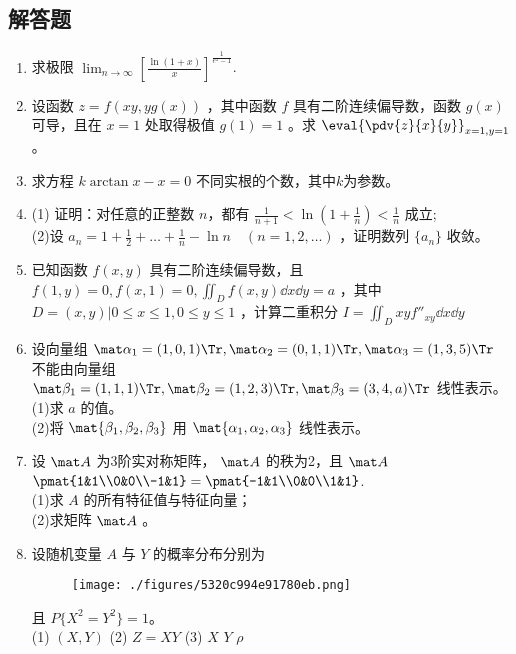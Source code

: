 \subsection{解答题}
\begin{enumerate}
\item 求极限  $\displaystyle \lim_{n\to\infty}[\frac{\ln (1+x)}{x}]^{\frac{1}{e^x-1}}$.
\item 设函数 $z=f(xy,yg(x))$ ，其中函数 $f$ 具有二阶连续偏导数，函数 $g(x)$ 可导，且在 $x=1$ 处取得极值 $g(1)=1$ 。求 $\displaystyle \eval{\pdv{z}{x}{y}}_{x=1,y=1}$。
\item 求方程 $k\arctan x -x=0$ 不同实根的个数，其中$ k$为参数。
\item (1) 证明：对任意的正整数 $n$，都有 $\frac{1}{n+1}<\ln(1+\frac{1}{n})<\frac{1}{n}$ 成立;\\
(2)设 $\displaystyle a_n=1+\frac{1}{2}+\dots+\frac{1}{n}-\ln n\quad (n=1,2,\dots )$  ，证明数列 $\{a_n\}$ 收敛。
\item 已知函数 $f(x,y)$ 具有二阶连续偏导数，且 $f(1,y)=0,f(x,1)=0,\iint_D f(x,y)\dd{x}\dd{y}=a$  ，其中 $D={(x,y)|0\le x \le 1,0 \le y \le 1}$ ，计算二重积分 $\displaystyle I=\iint_D xyf''_{xy}\dd{x}\dd{y}$
\item 设向量组  $\mat \alpha_1=(1,0,1) \Tr,\mat \alpha_2=(0,1,1)\Tr,\mat \alpha_3=(1,3,5)\Tr$  不能由向量组 $ \mat \beta_1=(1,1,1) \Tr,\mat \beta_2=(1,2,3) \Tr,\mat \beta_3=(3,4,a) \Tr$ 线性表示。\\
(1)求 $a$ 的值。\\
(2)将 $\mat {\beta_1,\beta_2,\beta_3}$ 用 $\mat {\alpha_1,\alpha_2,\alpha_3}$ 线性表示。
\item 设 $\mat A$ 为3阶实对称矩阵， $\mat A$  的秩为2，且 $\mat A$ $\pmat{1&1\\0&0\\-1&1}=\pmat{-1&1\\0&0\\1&1}$.\\
(1)求 $A$ 的所有特征值与特征向量；\\
(2)求矩阵  $\mat A$ 。
\item 设随机变量 $A$ 与 $Y$ 的概率分布分别为\begin{figure}[ht]
\centering
\texttt{[image: ./figures/5320c994e91780eb.png]}
\caption{} \label{fig_PeeM11_1}
\end{figure}
且 $P\{X^2=Y^2\}=1$。\\
(1) $(X,Y)$
(2) $Z=XY$
(3) $X$  $Y$ $\rho$
\end{enumerate}